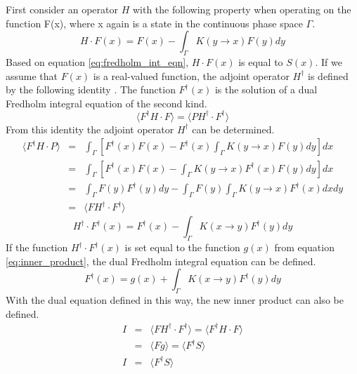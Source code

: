 First consider an operator $H$ with the following property when operating
on the function F(x), where x again is a state in the continuous phase space
$\Gamma$. 
\begin{equation}
  H \cdot F(x) = F(x) - \int_{\Gamma} K(y \to x)F(y)dy
  \label{eq:forward_operator}
\end{equation}
Based on equation \ref{eq:fredholm_int_eqn}, $H \cdot F(x)$ is equal to $S(x)$.
If we assume that $F(x)$ is a real-valued function, the adjoint operator 
$H^{\dagger}$ is defined by the following identity 
\citep{lewis_computational_1993}. The function $F^{\dagger}(x)$ is the solution 
of a dual Fredholm integral equation of the second kind. 
\begin{equation}
  \langle F^{\dagger}H \cdot F \rangle = 
  \langle PH^{\dagger} \cdot F^{\dagger} \rangle
  \label{eq:forward_adjoint_ops}
\end{equation}
From this identity the adjoint operator $H^{\dagger}$ can be determined.
\begin{eqnarray}
  \langle F^{\dagger}H \cdot P \rangle & = & \int_{\Gamma} \left[F^{\dagger}(x)F(x) -
  F^{\dagger}(x)\int_{\Gamma}K(y \to x)F(y)dy \right]dx \nonumber \\
  & = & \int_{\Gamma} \left[F^{\dagger}(x)F(x) -
  \int_{\Gamma}K(y \to x)F^{\dagger}(x)F(y)dy \right]dx \nonumber \\
  & = & \int_{\Gamma} F(y)F^{\dagger}(y)dy - 
  \int_{\Gamma}F(y)\int_{\Gamma}K(y \to x)F^{\dagger}(x)dxdy \nonumber \\
  & = & \langle FH^{\dagger} \cdot F^{\dagger} \rangle \nonumber
\end{eqnarray}
\begin{equation}
  H^{\dagger} \cdot F^{\dagger}(x) = F^{\dagger}(x) - 
  \int_{\Gamma}K(x \to y)F^{\dagger}(y)dy
  \label{eq:adjoint_operator}
\end{equation}
If the function $H^{\dagger} \cdot F^{\dagger}(x)$ is set equal to the function
$g(x)$ from equation \ref{eq:inner_product}, the dual Fredholm integral
equation can be defined.
\begin{equation}
  F^{\dagger}(x) = g(x) + \int_{\Gamma}K(x \to y)F^{\dagger}(y)dy
  \label{eq:dual_fredholm_int_eqn}
\end{equation}
With the dual equation defined in this way, the new inner product can also
be defined.
\begin{eqnarray}
  I & = & \langle FH^{\dagger} \cdot F^{\dagger} \rangle = 
  \langle F^{\dagger}H \cdot F \rangle \nonumber \\
  & = & \langle Fg \rangle \nonumber = \langle F^{\dagger}S \rangle \nonumber \\
  I & = & \langle F^{\dagger}S \rangle
\end{eqnarray}

